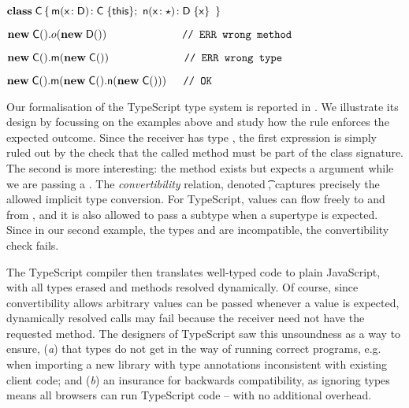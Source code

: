 \documentclass[acmlarge, anonymous, authordraft]{acmart}
\newcommand{\FZ}[1]{\textbf{FZ: #1}}
\begin{document}
\medskip
\(
\Class \C {   \Mdef\m\x\D\C \this  ; \   \Mdef\n\x\any\D \x }
\)

\medskip
\( \Call {\New \C{}} o {\New \D{}} \ \ \ \ \ \ \ \ \ \ \ \ \ \ \ \ \ \ \ \texttt{    // ERR wrong method } \)

\(\Call {\New \C{}} \m {\New \C{}} \ \ \ \ \ \ \ \ \ \ \ \ \ \ \ \ \ \ \ \texttt{ // ERR wrong type } \)

\({\sf{\bf new}}\;{\sf{C}}().{\sf{m}}({\sf{\bf new}}\;{\sf{C}}().{\sf{n}}({\sf{\bf new}}\;{\sf{C}}())) \ \ \ \texttt{ // OK } \)


\medskip


%
%
\noindent
Our formalisation of the TypeScript type system is reported in .  We illustrate its design by focussing on the examples above and study how the  rule enforces the expected outcome.  Since the receiver has type \C, the first expression is simply ruled out by the check that the called method must be part of the class signature.  The second is more interesting: the method exists but expects a \D argument while we are passing a \C.  The \emph{convertibility} relation, denoted   \ConvertE{}\t\tp, captures precisely the allowed implicit type conversion.  For TypeScript, values can flow freely to and from \any, and it is also allowed to pass a subtype when a supertype is expected.  Since in our second example, the types \C and \D are incompatible, the convertibility check fails.

The TypeScript compiler then translates well-typed code to plain JavaScript, with all types erased and methods resolved dynamically. Of course, since convertibility allows arbitrary values can be passed whenever a \any value is expected, dynamically resolved calls may fail because the receiver need not have the requested method. The designers of TypeScript saw this unsoundness as a way to
ensure, ({\em a}) that types do not get in the way of running correct
programs, e.g. when importing a new library with type annotations
inconsistent with existing client code; and ({\em b}) an insurance for
backwards compatibility, as ignoring types means all browsers can run
TypeScript code -- with no additional overhead.
\end{document}
